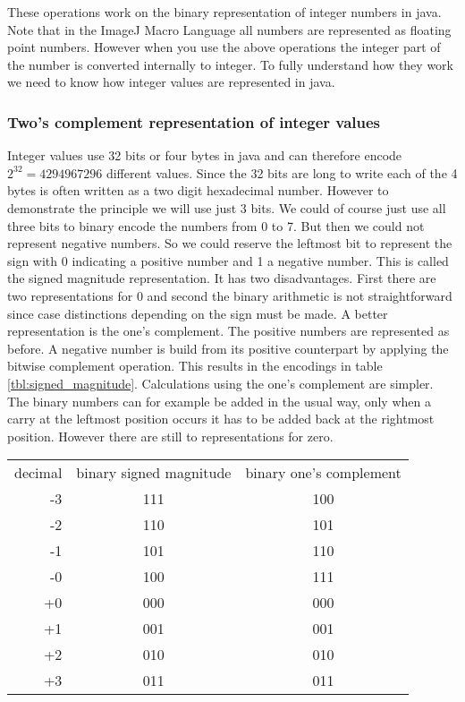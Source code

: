 These operations work on the binary representation of integer numbers in java. Note that in the ImageJ Macro Language all numbers are represented as floating point numbers. However when you use the above operations the integer part of the number is converted internally to integer. To fully understand how they work we need to know how integer values are represented in java. 

\subsubsection{Two's complement representation of integer values}

Integer values use 32 bits or four bytes in java and can therefore encode $2^{32} = 4294967296$ different values. Since the 32 bits are long to write each of the 4 bytes is often written as a two digit hexadecimal number. However to demonstrate the principle we will use just 3 bits. We could of course just use all three bits to binary encode the numbers from 0 to 7. But then we could not represent negative numbers. So we could reserve the leftmost bit to represent the sign with 0 indicating a positive number and 1 a negative number. This is called the signed magnitude representation. It has two disadvantages. First there are two representations for 0 and second the binary arithmetic is not straightforward since case distinctions depending on the sign must be made. A better representation is the one's complement. The positive numbers are represented as before. A negative number is build from its positive counterpart by applying the bitwise complement operation. This results in the encodings in table \ref{tbl:signed_magnitude}. Calculations using the one's complement are simpler. The binary numbers can for example be added in the usual way, only when a carry at the leftmost position occurs it has to be added back at the rightmost position. However there are still to representations for zero. 

\begin{center}
\begin{tabular}{rcc}
decimal & binary signed magnitude & binary one's complement  \\
-3 & 111 & 100 \\
-2 & 110 & 101 \\
-1 & 101 & 110 \\
-0 & 100 & 111 \\
+0 & 000 & 000 \\
+1 & 001 & 001 \\
+2 & 010 & 010 \\
+3 & 011 & 011 \\
\end{tabular}
\label{tbl:signed_magnitude}
\end{center}
      
